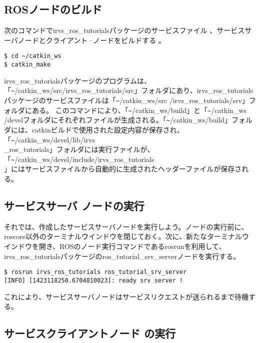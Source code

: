 \subsection{ROSノードのビルド}

次のコマンドでirvs\_ros\_tutorialsパッケージのサービスファイル 、サービスサーバノードとクライアント·ノードをビルドする  。

\begin{lstlisting}[language=ROS]
$ cd ~/catkin_ws
$ catkin_make
\end{lstlisting}

irvs\_ros\_tutorialsパッケージのプログラムは、「\verb|~|/catkin\_ws/src/irvs\_ros\_tutorials/src」フォルダにあり、irvs\_ros\_tutorialsパッケージのサービスファイルは「\verb|~|/catkin\_ws/src /irvs\_ros\_tutorials/srv」フォルダにある。
このコマンドにより、「\verb|~|/catkin\_ws/build」と「\verb|~|/catkin\_ws /develフォルダにそれぞれファイルが生成される。「\verb|~|/catkin\_ws/build」フォルダには、catkinビルドで使用された設定内容が保存され、「\verb|~|/catkin\_ws/devel/lib/irvs\\\_ros\_tutorials」フォルダには実行ファイルが、「\verb|~|/catkin\_ws/devel/include/irvs\_ros\_tutorials\\」にはサービスファイルから自動的に生成されたヘッダーファイルが保存される。

\subsection{サービスサーバ  ノードの実行}

それでは、作成したサービスサーバノードを実行しよう。ノードの実行前に、roscore以外のターミナルウインドウを閉じておく。次に、新たなターミナルウインドウを開き、ROSのノード実行コマンドであるrosrunを利用して、irvs\_ros\_tutorialsパッケージのros\_tutorial\_srv\_serverノードを実行する。

\begin{lstlisting}[language=ROS]
$ rosrun irvs_ros_tutorials ros_tutorial_srv_server
[INFO] [1423118250.6704810023]: ready srv server !
\end{lstlisting}

これにより、サービスサーバノードはサービスリクエストが送られるまで待機する。

\subsection{サービスクライアントノード  の実行}

